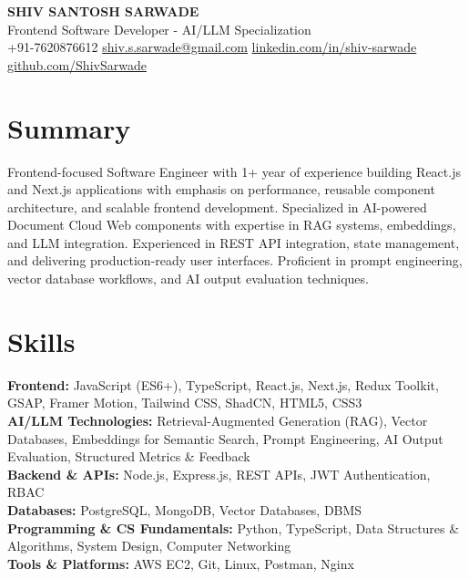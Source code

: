 \documentclass[a4paper,10pt]{article}
\begin{document}
    \pagestyle{empty}

    \begin{center}
        {\LARGE \textbf{SHIV SANTOSH SARWADE}}\\
        Frontend Software Developer - AI/LLM Specialization\\[4pt]
        +91-7620876612 \quad
        \href{mailto:shiv.s.sarwade@gmail.com}{shiv.s.sarwade@gmail.com} \quad
        \href{https://linkedin.com/in/shiv-sarwade}{linkedin.com/in/shiv-sarwade} \quad
        \href{https://github.com/ShivSarwade}{github.com/ShivSarwade}
    \end{center}

    \section*{Summary}

    Frontend-focused Software Engineer with 1+ year of experience building React.js and Next.js applications with emphasis on performance, reusable component architecture, and scalable frontend development. Specialized in AI-powered Document Cloud Web components with expertise in RAG systems, embeddings, and LLM integration. Experienced in REST API integration, state management, and delivering production-ready user interfaces. Proficient in prompt engineering, vector database workflows, and AI output evaluation techniques.

    \section*{Skills}

    \textbf{Frontend:} JavaScript (ES6+), TypeScript, React.js, Next.js, Redux Toolkit, GSAP, Framer Motion, Tailwind CSS, ShadCN, HTML5, CSS3\\
    \textbf{AI/LLM Technologies:} Retrieval-Augmented Generation (RAG), Vector Databases, Embeddings for Semantic Search, Prompt Engineering, AI Output Evaluation, Structured Metrics \& Feedback\\
    \textbf{Backend \& APIs:} Node.js, Express.js, REST APIs, JWT Authentication, RBAC\\
    \textbf{Databases:} PostgreSQL, MongoDB, Vector Databases, DBMS\\
    \textbf{Programming \& CS Fundamentals:} Python, TypeScript, Data Structures \& Algorithms, System Design, Computer Networking\\
    \textbf{Tools \& Platforms:} AWS EC2, Git, Linux, Postman, Nginx
\end{document}

